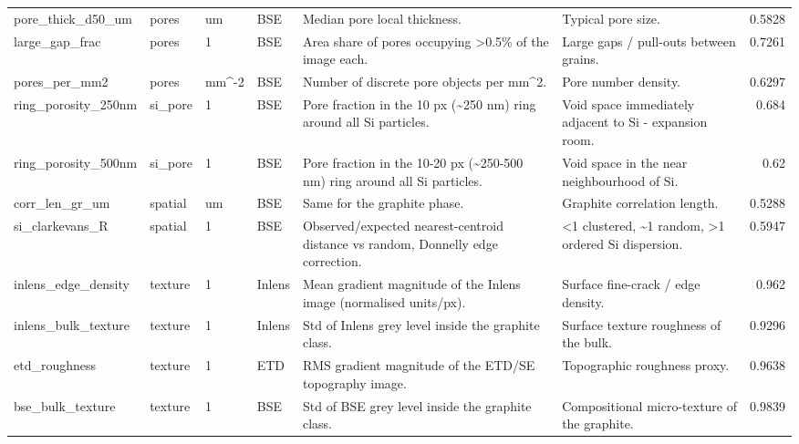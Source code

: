 \documentclass[11pt,a4paper]{article}
\begin{document}
\begin{longtable}{llllp{4.6cm}p{4.2cm}r}
pore\_thick\_d50\_um & pores & um & BSE & Median pore local thickness. & Typical pore size. & 0.5828 \\
large\_gap\_frac & pores & 1 & BSE & Area share of pores occupying >0.5\% of the image each. & Large gaps / pull-outs between grains. & 0.7261 \\
pores\_per\_mm2 & pores & mm\textasciicircum -2 & BSE & Number of discrete pore objects per mm\textasciicircum 2. & Pore number density. & 0.6297 \\
ring\_porosity\_250nm & si\_pore & 1 & BSE & Pore fraction in the 10 px (\textasciitilde 250 nm) ring around all Si particles. & Void space immediately adjacent to Si - expansion room. & 0.684 \\
ring\_porosity\_500nm & si\_pore & 1 & BSE & Pore fraction in the 10-20 px (\textasciitilde 250-500 nm) ring around all Si particles. & Void space in the near neighbourhood of Si. & 0.62 \\
corr\_len\_gr\_um & spatial & um & BSE & Same for the graphite phase. & Graphite correlation length. & 0.5288 \\
si\_clarkevans\_R & spatial & 1 & BSE & Observed/expected nearest-centroid distance vs random, Donnelly edge correction. & <1 clustered, \textasciitilde 1 random, >1 ordered Si dispersion. & 0.5947 \\
inlens\_edge\_density & texture & 1 & Inlens & Mean gradient magnitude of the Inlens image (normalised units/px). & Surface fine-crack / edge density. & 0.962 \\
inlens\_bulk\_texture & texture & 1 & Inlens & Std of Inlens grey level inside the graphite class. & Surface texture roughness of the bulk. & 0.9296 \\
etd\_roughness & texture & 1 & ETD & RMS gradient magnitude of the ETD/SE topography image. & Topographic roughness proxy. & 0.9638 \\
bse\_bulk\_texture & texture & 1 & BSE & Std of BSE grey level inside the graphite class. & Compositional micro-texture of the graphite. & 0.9839 \\
\end{longtable}
\normalsize
\scriptsize
\end{document}
